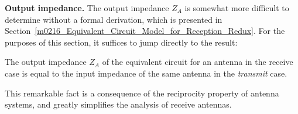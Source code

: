 {\bf Output impedance.}  The output impedance $Z_A$ is somewhat more difficult to determine without a formal derivation, which is presented in Section~\ref{m0216_Equivalent_Circuit_Model_for_Reception_Redux}.
For the purposes of this section, it suffices to jump directly to the result:
%
\begin{mdframed}[backgroundcolor=yellow!20,nobreak=true] 
The output impedance $Z_A$ of the equivalent circuit for an antenna in the receive case is equal to the input impedance of the same antenna in the \emph{transmit} case.
\end{mdframed}
%
This remarkable fact is a consequence of the reciprocity property of antenna systems, and greatly simplifies the analysis of receive antennas.

